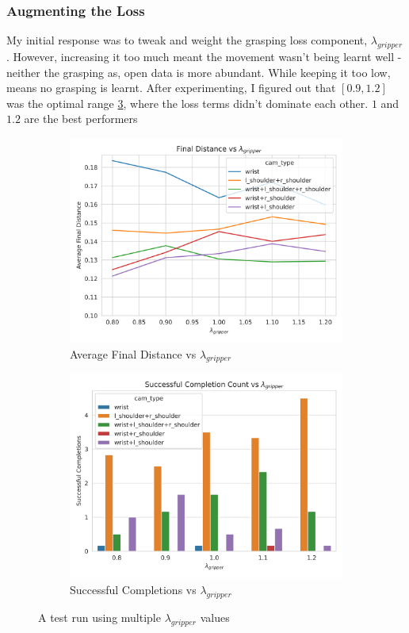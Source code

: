 \subsubsection{Augmenting the Loss}
My initial response was to tweak and weight the grasping loss component, $\lambda_{gripper}$. However, increasing it too much meant the movement wasn't being learnt well -neither the grasping as, open data is more abundant. While keeping it too low, means no grasping is learnt. After experimenting, I figured out that \(\left[0.9, 1.2\right]\) was the optimal range \ref{fig:grasp-tuning-lambda-g}, where the loss terms didn't dominate each other. $1$ and $1.2$ are the best performers

\begin{figure}[htpb] %
  \centering
  \begin{subfigure}{0.45\linewidth}
    \centering
    \includegraphics[width=0.7\linewidth]{assets/cam-comb/grasp-simple/tuning-normal-old-policy-lambda-g.png}
    \caption{Average Final Distance vs $\lambda_{gripper}$}\label{subfig:grasp-tuning-lambda-g}
  \end{subfigure}
  \begin{subfigure}{0.45\linewidth}
    \centering
    \includegraphics[width=0.7\linewidth]{assets/cam-comb/grasp-simple/tuning-normal-old-policy-success-lambda-g.png}
    \caption{Successful Completions vs $\lambda_{gripper}$}\label{subfig:grasp-tuning-lambda-g-success}
  \end{subfigure}
  \caption{A test run using multiple $\lambda_{gripper}$ values}\label{fig:grasp-tuning-lambda-g}
\end{figure}


